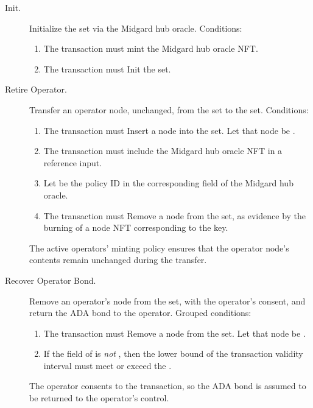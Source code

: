 \documentclass[../midgard.tex]{subfiles}
\begin{document}
\begin{description}
    \item[Init.] Initialize the  set via the Midgard hub oracle.
      Conditions:
        \begin{enumerate}
            \item The transaction must mint the Midgard hub oracle NFT.
            \item The transaction must Init the  set.
        \end{enumerate}
    \item[Retire Operator.] Transfer an operator node, unchanged, from the  set to the  set.
      Conditions:
        \begin{enumerate}
            \item The transaction must Insert a node into the  set.
              Let that node be .
            \item The transaction must include the Midgard hub oracle NFT in a reference input.
            \item Let  be the policy ID in the corresponding field of the Midgard hub oracle.
            \item The transaction must Remove a node from the  set, as evidence by the burning of a  node NFT corresponding to the  key.
        \end{enumerate}
        The active operators' minting policy ensures that the operator node's contents remain unchanged during the transfer.
    \item[Recover Operator Bond.] Remove an operator's node from the  set, with the operator's consent, and return the ADA bond to the operator.
      Grouped conditions:
        \begin{enumerate}
            \item The transaction must Remove a node from the  set.
              Let that node be .
            \item If the  field of  is \emph{not} , then the lower bound of the transaction validity interval must meet or exceed the .
        \end{enumerate}
    The operator consents to the transaction, so the ADA bond is assumed to be returned to the operator's control.

\end{description}
\end{document}
